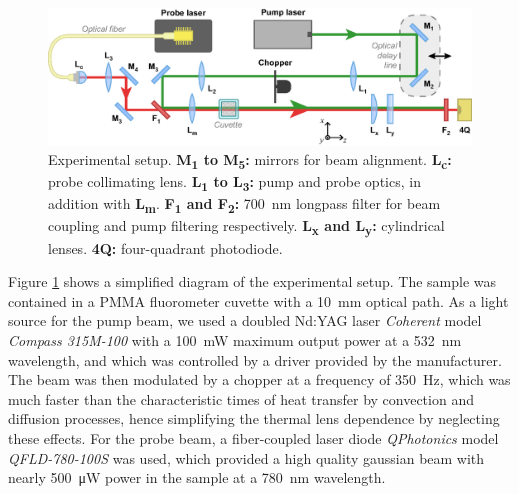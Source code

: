 \documentclass[10pt,authoryear,twocolumn]{article}
\newcommand{\FE}{\textit{FE}}
\newcommand{\low}[1]{\textsubscript{#1}} %
\begin{document}

\begin{figure}[h]
	\centering \includegraphics[width=\textwidth]{Figuras/1_Setup.eps}
	\caption{Experimental setup. \textbf{M\low{1} to M\low{5}:} mirrors for beam alignment. \textbf{L\low{c}:} probe collimating lens. \textbf{L\low{1} to L\low{3}:} pump and probe optics, in addition with \textbf{L\low{m}}. \textbf{F\low{1} and F\low{2}:} \SI{700}{\nano\metre} longpass filter for beam coupling and pump filtering respectively. \textbf{L\low{x} and L\low{y}:} cylindrical lenses. \textbf{4Q:} four-quadrant photodiode.}
	\label{fig:Experimental}
\end{figure}

Figure \ref{fig:Experimental} shows a simplified diagram of the experimental setup. The sample was contained in a PMMA fluorometer cuvette with a \SI{10}{\milli\metre} optical path. As a light source for the pump beam, we used a doubled Nd:YAG laser \emph{Coherent} model \emph{Compass 315M-100} with a \SI{100}{\milli\watt} maximum output power at a \SI{532}{\nano\metre} wavelength, and which was controlled by a driver provided by the manufacturer. The beam was then modulated by a chopper at a frequency of \SI{350}{\hertz}, which was much faster than the characteristic times of heat transfer by convection and diffusion processes, hence simplifying the thermal lens dependence by neglecting these effects. For the probe beam, a fiber-coupled laser diode \emph{QPhotonics} model \emph{QFLD-780-100S} was used, which provided a high quality gaussian beam with nearly \SI{500}{\micro\watt} power in the sample at a \SI{780}{\nano\metre} wavelength.
\end{document}
